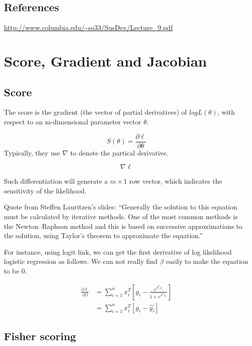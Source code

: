 \documentclass[
]{book}
\begin{document}
\hypertarget{references}{%
\section{References}\label{references}}

\url{http://www.columbia.edu/~so33/SusDev/Lecture_9.pdf}

\hypertarget{score-gradient-and-jacobian}{%
\chapter{Score, Gradient and Jacobian}\label{score-gradient-and-jacobian}}

\hypertarget{score}{%
\section{Score}\label{score}}

The score is the gradient (the vector of partial derivatives) of \(log L(\theta)\), with respect to an m-dimensional parameter vector \(\theta\).

\[S(\theta) = \frac{\partial\ell}{\partial \theta}\]
Typically, they use \(\nabla\) to denote the partical derivative.

\[\nabla \ell\]

Such differentiation will generate a \(m \times 1\) row vector, which indicates the sensitivity of the likelihood.

Quote from Steffen Lauritzen's slides: ``Generally the solution to this equation must be calculated by iterative methods. One of the most common methods is the Newton--Raphson
method and this is based on successive approximations to the solution, using Taylor's theorem to approximate the equation.''

For instance, using logit link, we can get the first derivative of log likelihood logistic regression as follows. We can not really find \(\beta\) easily to make the equation to be 0.

\[\begin{aligned}
\frac{\partial \ell} {\partial \beta} 
&= \sum_{i=1}^{n}x_i^T[y_i-\frac{e^{\beta^Tx_i}}{1+e^{\beta^Tx_i}}] \\
&=\sum_{i=1}^{n} x_i^T[y_i-\hat{y_i}]
\end{aligned}\]

\hypertarget{fisher-scoring}{%
\section{Fisher scoring}\label{fisher-scoring}}
\end{document}

